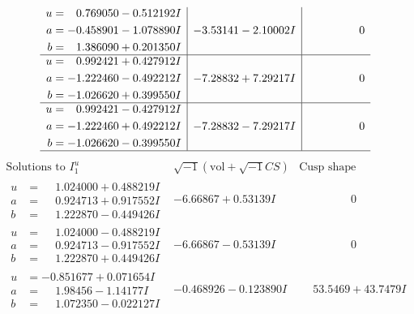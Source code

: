 \documentclass[1p]{elsarticle_modified}
\theoremstyle{definition}
\newcommand{\I}{\sqrt{-1}}
\begin{document}
$$\begin{array}{c|c|c}
\begin{aligned}
u &= \phantom{-}0.769050 - 0.512192 I \\
a &= -0.458901 - 1.078890 I \\
b &= \phantom{-}1.386090 + 0.201350 I\end{aligned}
 & -3.53141 - 2.10002 I & \phantom{-0.000000 } 0 \\ \hline\begin{aligned}
u &= \phantom{-}0.992421 + 0.427912 I \\
a &= -1.222460 - 0.492212 I \\
b &= -1.026620 + 0.399550 I\end{aligned}
 & -7.28832 + 7.29217 I & \phantom{-0.000000 } 0 \\ \hline\begin{aligned}
u &= \phantom{-}0.992421 - 0.427912 I \\
a &= -1.222460 + 0.492212 I \\
b &= -1.026620 - 0.399550 I\end{aligned}
 & -7.28832 - 7.29217 I & \phantom{-0.000000 } 0\\
 \hline 
 \end{array}$$\newpage$$\begin{array}{c|c|c}  
\text{Solutions to }I^u_{1}& \I (\text{vol} + \sqrt{-1}CS) & \text{Cusp shape}\\
 \hline 
\begin{aligned}
u &= \phantom{-}1.024000 + 0.488219 I \\
a &= \phantom{-}0.924713 + 0.917552 I \\
b &= \phantom{-}1.222870 - 0.449426 I\end{aligned}
 & -6.66867 + 0.53139 I & \phantom{-0.000000 } 0 \\ \hline\begin{aligned}
u &= \phantom{-}1.024000 - 0.488219 I \\
a &= \phantom{-}0.924713 - 0.917552 I \\
b &= \phantom{-}1.222870 + 0.449426 I\end{aligned}
 & -6.66867 - 0.53139 I & \phantom{-0.000000 } 0 \\ \hline\begin{aligned}
u &= -0.851677 + 0.071654 I \\
a &= \phantom{-}1.98456 - 1.14177 I \\
b &= \phantom{-}1.072350 - 0.022127 I\end{aligned}
 & -0.468926 - 0.123890 I & \phantom{-}53.5469 + 43.7479 I \\ \hline\begin{aligned}

\end{aligned}
\end{array}$$
\end{document}

